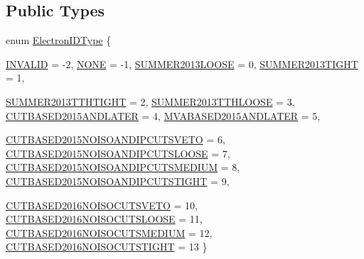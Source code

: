 \subsection*{Public Types}
\begin{DoxyCompactItemize}
\item 
enum \hyperlink{classHttValidElectronsProducer_ad4e8f1361e437e197126f52a538578d3}{ElectronIDType} \{ \par
\hyperlink{classHttValidElectronsProducer_ad4e8f1361e437e197126f52a538578d3aa4500fcb41d94192317e16d5d0a7932b}{INVALID} =  -\/2, 
\hyperlink{classHttValidElectronsProducer_ad4e8f1361e437e197126f52a538578d3af78fa54075517cb7cd2656fd8b436529}{NONE} =  -\/1, 
\hyperlink{classHttValidElectronsProducer_ad4e8f1361e437e197126f52a538578d3a0254637102c75f7e4df9cb337da2e1d5}{SUMMER2013LOOSE} =  0, 
\hyperlink{classHttValidElectronsProducer_ad4e8f1361e437e197126f52a538578d3a976c643d768971c30c99410b51b9eb62}{SUMMER2013TIGHT} =  1, 
\par
\hyperlink{classHttValidElectronsProducer_ad4e8f1361e437e197126f52a538578d3a6cd64bfbbef04d42f9908a6fe96dd7b9}{SUMMER2013TTHTIGHT} =  2, 
\hyperlink{classHttValidElectronsProducer_ad4e8f1361e437e197126f52a538578d3afdff23fab549c8951682694db8628e36}{SUMMER2013TTHLOOSE} =  3, 
\hyperlink{classHttValidElectronsProducer_ad4e8f1361e437e197126f52a538578d3a5a03216f07b395797dbb7037cff9252f}{CUTBASED2015ANDLATER} =  4, 
\hyperlink{classHttValidElectronsProducer_ad4e8f1361e437e197126f52a538578d3af9a854b70d468a2504277a276a81a1c6}{MVABASED2015ANDLATER} =  5, 
\par
\hyperlink{classHttValidElectronsProducer_ad4e8f1361e437e197126f52a538578d3a91405eb56bc38794aa61f037481cac9b}{CUTBASED2015NOISOANDIPCUTSVETO} =  6, 
\hyperlink{classHttValidElectronsProducer_ad4e8f1361e437e197126f52a538578d3ad3e287b5aa3f888f0976e394b5ceff2e}{CUTBASED2015NOISOANDIPCUTSLOOSE} =  7, 
\hyperlink{classHttValidElectronsProducer_ad4e8f1361e437e197126f52a538578d3ac574083e81d10633124e638b9e76ff63}{CUTBASED2015NOISOANDIPCUTSMEDIUM} =  8, 
\hyperlink{classHttValidElectronsProducer_ad4e8f1361e437e197126f52a538578d3abb0bf92e0ec81f3b7c0f53b5c90e7e78}{CUTBASED2015NOISOANDIPCUTSTIGHT} =  9, 
\par
\hyperlink{classHttValidElectronsProducer_ad4e8f1361e437e197126f52a538578d3a72bc0f4cfa339f782aae7384e64d6916}{CUTBASED2016NOISOCUTSVETO} =  10, 
\hyperlink{classHttValidElectronsProducer_ad4e8f1361e437e197126f52a538578d3aa6cb20cbe205f30a779ff7a5afed5eca}{CUTBASED2016NOISOCUTSLOOSE} =  11, 
\hyperlink{classHttValidElectronsProducer_ad4e8f1361e437e197126f52a538578d3a1274e591c8064f9e1dd379b82d98e4d5}{CUTBASED2016NOISOCUTSMEDIUM} =  12, 
\hyperlink{classHttValidElectronsProducer_ad4e8f1361e437e197126f52a538578d3aa2117a69063c0ee8ea5510e95e9f57df}{CUTBASED2016NOISOCUTSTIGHT} =  13
 \}
\end{DoxyCompactItemize}

